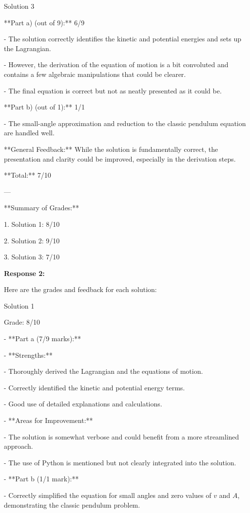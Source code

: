 \documentclass[a4paper,11pt]{article}
\begin{document}
Solution 3

**Part a) (out of 9):** 6/9

- The solution correctly identifies the kinetic and potential energies and sets up the Lagrangian.

- However, the derivation of the equation of motion is a bit convoluted and contains a few algebraic manipulations that could be clearer.

- The final equation is correct but not as neatly presented as it could be.

**Part b) (out of 1):** 1/1

- The small-angle approximation and reduction to the classic pendulum equation are handled well.

**General Feedback:** While the solution is fundamentally correct, the presentation and clarity could be improved, especially in the derivation steps.

**Total:** 7/10

---

**Summary of Grades:**

1. Solution 1: 8/10

2. Solution 2: 9/10

3. Solution 3: 7/10

\bigskip
\textbf{Response 2:}

Here are the grades and feedback for each solution:

Solution 1

Grade: 8/10

- **Part a (7/9 marks):** 

  - **Strengths:**
  
    - Thoroughly derived the Lagrangian and the equations of motion.
    
    - Correctly identified the kinetic and potential energy terms.
    
    - Good use of detailed explanations and calculations.
    
  - **Areas for Improvement:**
  
    - The solution is somewhat verbose and could benefit from a more streamlined approach.
    
    - The use of Python is mentioned but not clearly integrated into the solution.
    
- **Part b (1/1 mark):** 

  - Correctly simplified the equation for small angles and zero values of \( v \) and \( A \), demonstrating the classic pendulum problem.
\end{document}
